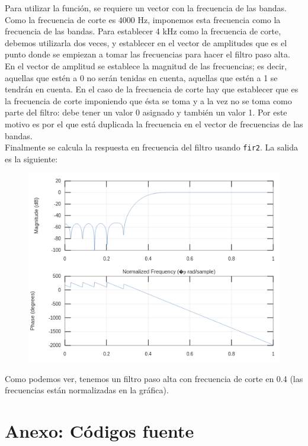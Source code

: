 \documentclass[11pt,a4paper]{article}
\begin{document}
Para utilizar la función, se requiere un vector  con la frecuencia de las bandas. Como la frecuencia de corte es 4000 Hz, imponemos esta frecuencia como la frecuencia de las bandas. Para establecer 4 kHz como la frecuencia de corte, debemos utilizarla dos veces, y establecer en el vector de amplitudes que es el punto donde se empiezan a tomar las frecuencias para hacer el filtro paso alta.\\

En el vector de amplitud se establece la magnitud de las frecuencias; es decir, aquellas que estén a 0 no serán tenidas en cuenta, aquellas que estén a 1 se tendrán en cuenta. En el caso de la frecuencia de corte hay que establecer que es la frecuencia de corte imponiendo que ésta se toma y a la vez no se toma como parte del filtro: debe tener un valor 0 asignado y también un valor 1. Por este motivo es por el que está duplicada la frecuencia en el vector de frecuencias de las bandas.\\

Finalmente se calcula la respuesta en frecuencia del filtro usando \texttt{fir2}. La salida es la siguiente:

\begin{figure}[H]
	\centering
	\includegraphics[scale=0.5]{img/9.png}
\end{figure}

Como podemos ver, tenemos un filtro paso alta con frecuencia de corte en 0.4 (las frecuencias están normalizadas en la gráfica).

\newpage

\section{Anexo: Códigos fuente}
\end{document}
